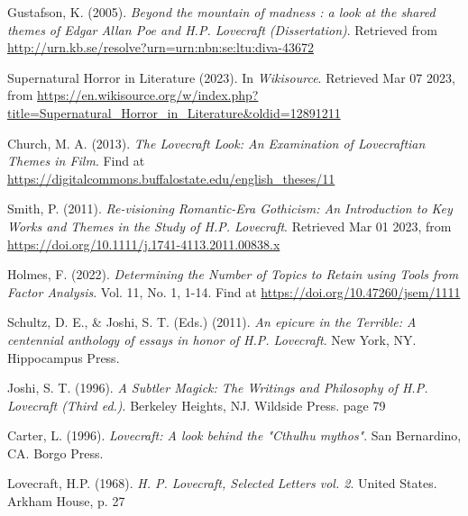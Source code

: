 \begin{thebibliography}{9}
Gustafson, K. (2005). \emph{Beyond the mountain of madness : a look at the shared themes of Edgar Allan Poe and H.P. Lovecraft (Dissertation)}. Retrieved from \href{http://urn.kb.se/resolve?urn=urn:nbn:se:ltu:diva-43672}{http://urn.kb.se/resolve?urn=urn:nbn:se:ltu:diva-43672}

Supernatural Horror in Literature (2023). In \emph{Wikisource}. Retrieved Mar 07 2023, from \href{https://en.wikisource.org/w/index.php?title=Supernatural_Horror_in_Literature&oldid=12891211}{https://en.wikisource.org/w/index.php?title=Supernatural\_Horror\_in\_Literature\&oldid=12891211}

Church, M. A. (2013). \emph{The Lovecraft Look: An Examination of Lovecraftian Themes in Film}. Find at \href{https://digitalcommons.buffalostate.edu/english\_theses/11}{https://digitalcommons.buffalostate.edu/english\_theses/11}

Smith, P. (2011). \emph{Re-visioning Romantic-Era Gothicism: An Introduction to Key Works and Themes in the Study of H.P. Lovecraft}. Retrieved Mar 01 2023, from \href{https://doi.org/10.1111/j.1741-4113.2011.00838.x}{https://doi.org/10.1111/j.1741-4113.2011.00838.x}

Holmes, F. (2022). \emph{Determining the Number of Topics to Retain using Tools from Factor Analysis}. Vol. 11, No. 1, 1-14. Find at \href{https://doi.org/10.47260/jsem/1111}{https://doi.org/10.47260/jsem/1111}

Schultz, D. E., \& Joshi, S. T. (Eds.) (2011). \emph{An epicure in the Terrible: A centennial anthology of essays in honor of H.P. Lovecraft}. New York, NY. Hippocampus Press. 

Joshi, S. T. (1996). \emph{A Subtler Magick: The Writings and Philosophy of H.P. Lovecraft (Third ed.)}. Berkeley Heights, NJ. Wildside Press. page 79

Carter, L. (1996). \emph{Lovecraft: A look behind the "Cthulhu mythos"}. San Bernardino, CA. Borgo Press. 

Lovecraft, H.P. (1968). \emph{H. P. Lovecraft, Selected Letters vol. 2}. United States. Arkham House, p. 27

\end{thebibliography}